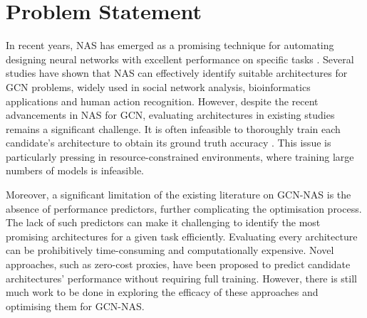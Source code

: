 \section{Problem Statement}\label{ProblemStatement}
In recent years, NAS has emerged as a promising technique for automating designing neural networks with excellent performance on specific tasks \autocite{zoph2016neural}. Several studies have shown that NAS can effectively identify suitable architectures for GCN problems, widely used in social network analysis, bioinformatics applications and human action recognition. However, despite the recent advancements in NAS for GCN, evaluating architectures in existing studies remains a significant challenge. It is often infeasible to thoroughly train each candidate's architecture to obtain its ground truth accuracy \autocite{zoph2016neural}. This issue is particularly pressing in resource-constrained environments, where training large numbers of models is infeasible.

Moreover, a significant limitation of the existing literature on GCN-NAS is the absence of performance predictors, further complicating the optimisation process. The lack of such predictors can make it challenging to identify the most promising architectures for a given task efficiently. Evaluating every architecture can be prohibitively time-consuming and computationally expensive. Novel approaches, such as zero-cost proxies, have been proposed to predict candidate architectures' performance without requiring full training. However, there is still much work to be done in exploring the efficacy of these approaches and optimising them for GCN-NAS.